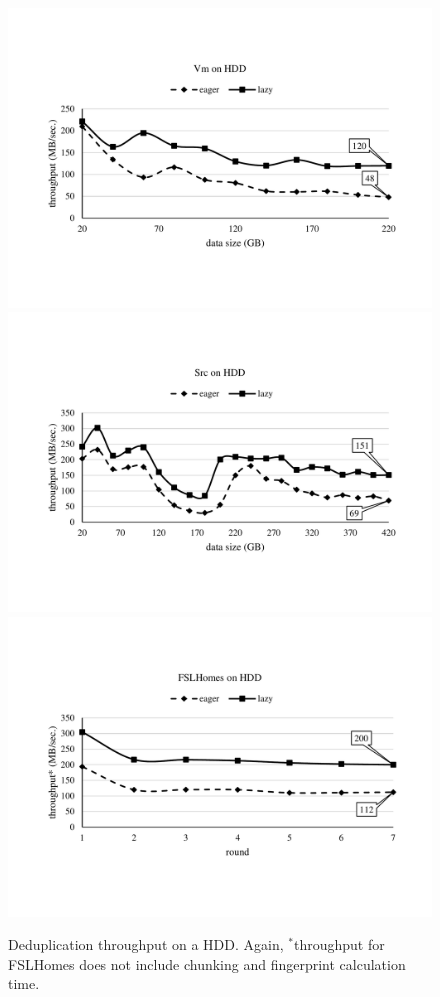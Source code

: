 \documentclass[prodmode,acmtecs]{acmsmall}
\begin{document}
\begin{figure}[htp]
\centering

\includegraphics[width=0.8\columnwidth]{overall-hdd-vm}
\\[0.5em]

\includegraphics[width=0.8\columnwidth]{overall-hdd-src}
\\[0.5em]

\includegraphics[width=0.8\columnwidth]{overall-hdd-home}
\caption{Deduplication throughput on a HDD. Again, $^*$throughput for FSLHomes does not include chunking and fingerprint calculation time.}
\label{fig:overall-HDD}
\end{figure}
\end{document}

